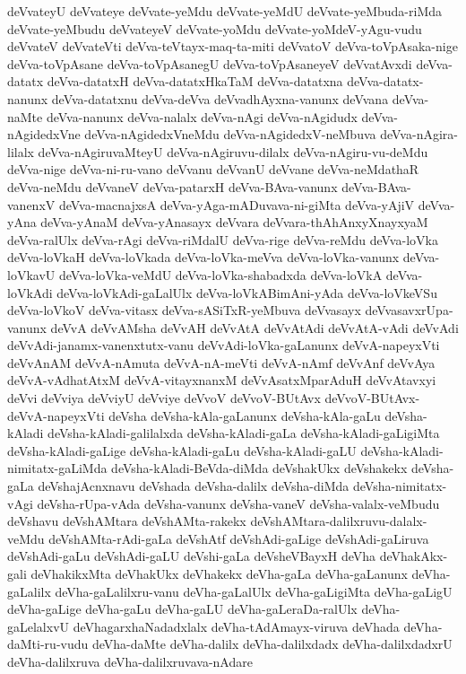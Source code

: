 {deVvateyU
deVvateye
deVvate-yeMdu
deVvate-yeMdU
deVvate-yeMbuda-riMda
deVvate-yeMbudu
deVvateyeV
deVvate-yoMdu
deVvate-yoMdeV-yAgu-vudu
deVvateV
deVvateVti
deVva-teVtayx-maq-ta-miti
deVvatoV
deVva-toVpAsaka-nige
deVva-toVpAsane
deVva-toVpAsanegU
deVva-toVpAsaneyeV
deVvatAvxdi
deVva-datatx
deVva-datatxH
deVva-datatxHkaTaM
deVva-datatxna
deVva-datatx-nanunx
deVva-datatxnu
deVva-deVva
deVvadhAyxna-vanunx
deVvana
deVva-naMte
deVva-nanunx
deVva-nalalx
deVva-nAgi
deVva-nAgidudx
deVva-nAgidedxVne
deVva-nAgidedxVneMdu
deVva-nAgidedxV-neMbuva
deVva-nAgira-lilalx
deVva-nAgiruvaMteyU
deVva-nAgiruvu-dilalx
deVva-nAgiru-vu-deMdu
deVva-nige
deVva-ni-ru-vano
deVvanu
deVvanU
deVvane
deVva-neMdathaR
deVva-neMdu
deVvaneV
deVva-patarxH
deVva-BAva-vanunx
deVva-BAva-vanenxV
deVva-macnajxsA
deVva-yAga-mADuvava-ni-giMta
deVva-yAjiV
deVva-yAna
deVva-yAnaM
deVva-yAnasayx
deVvara
deVvara-thAhAnxyXnayxyaM
deVva-ralUlx
deVva-rAgi
deVva-riMdalU
deVva-rige
deVva-reMdu
deVva-loVka
deVva-loVkaH
deVva-loVkada
deVva-loVka-meVva
deVva-loVka-vanunx
deVva-loVkavU
deVva-loVka-veMdU
deVva-loVka-shabadxda
deVva-loVkA
deVva-loVkAdi
deVva-loVkAdi-gaLalUlx
deVva-loVkABimAni-yAda
deVva-loVkeVSu
deVva-loVkoV
deVva-vitasx
deVva-sASiTxR-yeMbuva
deVvasayx
deVvasavxrUpa-vanunx
deVvA
deVvAMsha
deVvAH
deVvAtA
deVvAtAdi
deVvAtA-vAdi
deVvAdi
deVvAdi-janamx-vanenxtutx-vanu
deVvAdi-loVka-gaLanunx
deVvA-napeyxVti
deVvAnAM
deVvA-nAmuta
deVvA-nA-meVti
deVvA-nAmf
deVvAnf
deVvAya
deVvA-vAdhatAtxM
deVvA-vitayxnanxM
deVvAsatxMparAduH
deVvAtavxyi
deVvi
deVviya
deVviyU
deVviye
deVvoV
deVvoV-BUtAvx
deVvoV-BUtAvx-deVvA-napeyxVti
deVsha
deVsha-kAla-gaLanunx
deVsha-kAla-gaLu
deVsha-kAladi
deVsha-kAladi-galilalxda
deVsha-kAladi-gaLa
deVsha-kAladi-gaLigiMta
deVsha-kAladi-gaLige
deVsha-kAladi-gaLu
deVsha-kAladi-gaLU
deVsha-kAladi-nimitatx-gaLiMda
deVsha-kAladi-BeVda-diMda
deVshakUkx
deVshakekx
deVsha-gaLa
deVshajAcnxnavu
deVshada
deVsha-dalilx
deVsha-diMda
deVsha-nimitatx-vAgi
deVsha-rUpa-vAda
deVsha-vanunx
deVsha-vaneV
deVsha-valalx-veMbudu
deVshavu
deVshAMtara
deVshAMta-rakekx
deVshAMtara-dalilxruvu-dalalx-veMdu
deVshAMta-rAdi-gaLa
deVshAtf
deVshAdi-gaLige
deVshAdi-gaLiruva
deVshAdi-gaLu
deVshAdi-gaLU
deVshi-gaLa
deVsheVBayxH
deVha
deVhakAkx-gali
deVhakikxMta
deVhakUkx
deVhakekx
deVha-gaLa
deVha-gaLanunx
deVha-gaLalilx
deVha-gaLalilxru-vanu
deVha-gaLalUlx
deVha-gaLigiMta
deVha-gaLigU
deVha-gaLige
deVha-gaLu
deVha-gaLU
deVha-gaLeraDa-ralUlx
deVha-gaLelalxvU
deVhagarxhaNadadxlalx
deVha-tAdAmayx-viruva
deVhada
deVha-daMti-ru-vudu
deVha-daMte
deVha-dalilx
deVha-dalilxdadx
deVha-dalilxdadxrU
deVha-dalilxruva
deVha-dalilxruvava-nAdare
}
